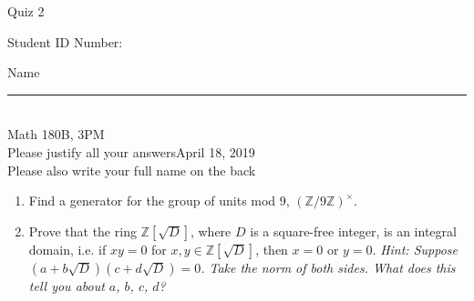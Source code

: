 \documentclass[12pt]{article}
\newcommand{\integers}{\mathbb{Z}}
\begin{document}
\begin{flushleft} 
\centerline{\LARGE{Quiz 2}} 
\vspace{5 mm}
{Student ID Number:}\hfill  
{Name \rule {2 in}{0.01in}}\\
Math 180B, 3PM
\\
{Please justify all your answers}\hfill {April 18, 2019}
\\
{Please also write your full name on the back} 

\medskip
\end{flushleft}

\begin{enumerate}
	\item Find a generator for the group of units mod 9, $(\integers/9\integers)^\times$. 
	\vfill
	\item Prove that the ring $\integers[\sqrt{D}]$, where $D$ is a square-free integer, is an integral domain, i.e. if $xy = 0$ for $x,y\in \integers[\sqrt{D}]$, then $x=0$ or $y=0$. \textit{Hint: Suppose $(a+b\sqrt{D})(c+d\sqrt{D}) = 0$. Take the norm of both sides. What does this tell you about $a$, $b$, $c$, $d$?}
	\vfill
\end{enumerate}

\end{document}
